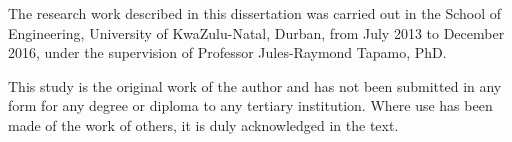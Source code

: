 \documentclass[
11pt, %
english, %
onehalfspacing, %
liststotoc, %
headsepline, %
]{MastersDoctoralThesis} %
\begin{document}

\begin{preface}
	\addchaptertocentry{\prefacename} %
	
	The research work described in this dissertation was carried out in the School of Engineering, University of KwaZulu-Natal, Durban, from July 2013 to December 2016, under the supervision of Professor Jules-Raymond Tapamo, PhD.
	
	This study is the original work of the author and has not been submitted in any form for any degree or diploma to any tertiary institution. Where use has been made of the work of others, it is duly acknowledged in the text.
	
\end{preface}


%
%
% 
% 
%
\end{document}
